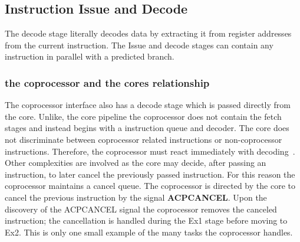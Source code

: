 \documentclass[11pt]{report}
\begin{document}
\subsection{Instruction Issue and Decode}
\begin{onehalfspace}
The decode stage literally decodes data by extracting it from register addresses from the current instruction. The Issue and decode stages can contain any instruction in parallel with a predicted branch. 
\subsubsection{the coprocessor and the cores relationship}
The coprocessor interface also has a decode stage which is passed directly from the core. Unlike, the core pipeline the coprocessor does not contain the fetch stages and instead begins with a instruction queue and decoder. The core does not discriminate between coprocessor related instructions or non-coprocessor instructions. Therefore, the coprocessor must react immediately with decoding~\citep[11-14]{arm1176jzf-s}. Other complexities are involved as the core may decide, after passing an instruction, to later cancel the previously passed instruction. For this reason the coprocessor maintains a cancel queue. The coprocessor is directed by the core to cancel the previous instruction by the signal \textbf{ACPCANCEL}. Upon the discovery of the ACPCANCEL signal the coprocessor removes the canceled instruction; the cancellation is handled during the Ex1 stage before moving to Ex2. This is only one small example of the many tasks the coprocessor handles.
\end{onehalfspace}
\end{document}
